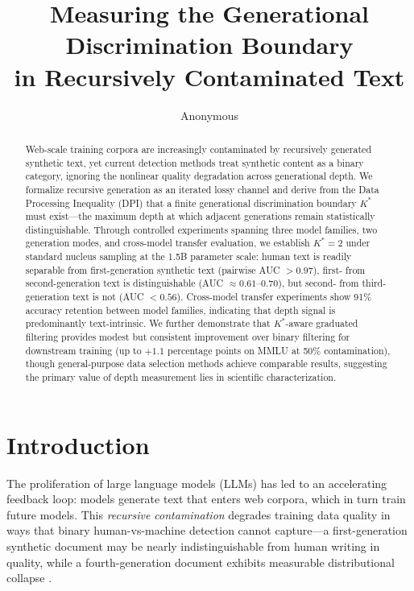 \documentclass[11pt,a4paper]{article}
\title{Measuring the Generational Discrimination Boundary\\in Recursively Contaminated Text}
\author{Anonymous}
\newcommand{\Kstar}{K^{*}}
\begin{document}
\maketitle

\begin{abstract}
Web-scale training corpora are increasingly contaminated by recursively generated synthetic text, yet current detection methods treat synthetic content as a binary category, ignoring the nonlinear quality degradation across generational depth.
We formalize recursive generation as an iterated lossy channel and derive from the Data Processing Inequality (DPI) that a finite generational discrimination boundary $\Kstar$ must exist---the maximum depth at which adjacent generations remain statistically distinguishable.
Through controlled experiments spanning three model families, two generation modes, and cross-model transfer evaluation, we establish $\Kstar=2$ under standard nucleus sampling at the 1.5B parameter scale: human text is readily separable from first-generation synthetic text (pairwise AUC $>0.97$), first- from second-generation text is distinguishable (AUC $\approx 0.61\text{--}0.70$), but second- from third-generation text is not (AUC $<0.56$).
Cross-model transfer experiments show 91\% accuracy retention between model families, indicating that depth signal is predominantly text-intrinsic.
We further demonstrate that $\Kstar$-aware graduated filtering provides modest but consistent improvement over binary filtering for downstream training (up to $+1.1$ percentage points on MMLU at 50\% contamination), though general-purpose data selection methods achieve comparable results, suggesting the primary value of depth measurement lies in scientific characterization.
\end{abstract}

\section{Introduction}
\label{sec:intro}

The proliferation of large language models (LLMs) has led to an accelerating feedback loop: models generate text that enters web corpora, which in turn train future models.
This \emph{recursive contamination} degrades training data quality in ways that binary human-vs-machine detection cannot capture---a first-generation synthetic document may be nearly indistinguishable from human writing in quality, while a fourth-generation document exhibits measurable distributional collapse \cite{shumailov2024collapse}.
\end{document}

